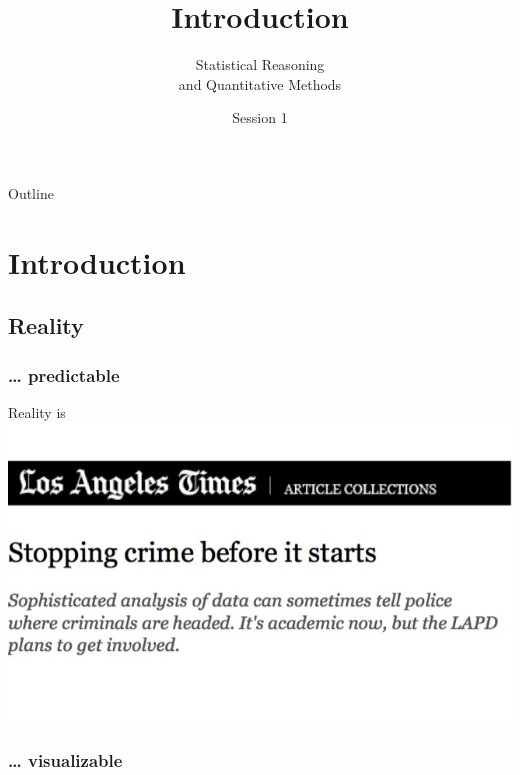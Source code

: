 \documentclass{beamer}
\author{Statistical Reasoning\\and Quantitative Methods}
\title{Introduction}
\institute{François Briatte \& Ivaylo Petev}
\date{Session 1}
\begin{document}
		
	\begin{frame}[t,plain]
		\titlepage
	\end{frame}
	
	\begin{frame}[t]{Outline}
		\tableofcontents[hideallsubsections]
	\end{frame}
	
	\section{Introduction}
	
	\subsection{Reality}
	
	\subsubsection{… predictable}
	
	\begin{frame}[t]{Reality is }
		\href{http://articles.latimes.com/2010/aug/21/local/la-me-predictcrime-20100427-1}{\includegraphics[width=\textwidth]{images/predicting.jpg}}
	\end{frame}
	
	\subsubsection{… visualizable}
	
\end{document}
